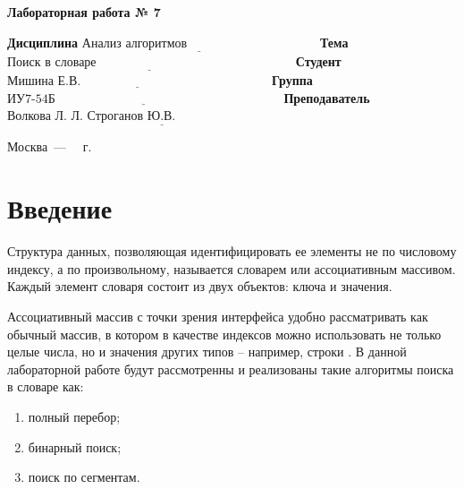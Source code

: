 \documentclass[12pt]{report}
\begin{document}
\begin{center}
\Large\textbf{Лабораторная работа № 7}
\end{center}
\vspace{\baselineskip}
\noindent\textbf{Дисциплина} $\underline{\text{Анализ алгоритмов~~~~~~~~~~~~~~~~~~~~~~~~~~~~~~~}}$\newline\newline
\noindent\textbf{Тема} $\underline{\text{Поиск в словаре~~~~~~~~~~~~~~~~~~~~~~~~~~~~~~~~~~~~~~~~~~~~~~~}}$\newline\newline
\noindent\textbf{Студент} $\underline{\text{Мишина Е.В.~~~~~~~~~~~~~~~~~~~~~~~~~~~~~~~~~~~~~~~~~~~~~}}$\newline\newline
\noindent\textbf{Группа} $\underline{\text{ИУ7-54Б~~~~~~~~~~~~~~~~~~~~~~~~~~~~~~~~~~~~~~~~~~~~~~~~~~~~~~}}$\newline\newline
\noindent\textbf{Преподаватель} $\underline{\text{Волкова Л. Л. Строганов Ю.В.~~~~~~~~~~~~~~~~~~~~~~~~~~~~~~~~~~}}$\newline

\begin{center}
	\vfill
	Москва~---~\the\year
	~г.
\end{center}
\clearpage

\tableofcontents

\newpage
\chapter*{Введение}
Структура данных, позволяющая идентифицировать ее элементы не
по числовому индексу, а по произвольному, называется словарем или ассоциативным массивом. Каждый элемент словаря состоит из двух объектов:
ключа и значения. 

Ассоциативный массив с точки зрения интерфейса удобно рассматривать как обычный массив, в котором в качестве индексов можно использовать не только целые числа, но и значения других типов – например, строки \cite{dict}.
В данной лабораторной работе будут рассмотренны и реализованы такие алгоритмы поиска в словаре как:
\begin{enumerate}
	\item полный перебор;
	\item бинарный поиск;
	\item поиск по сегментам.
\end{enumerate}
\vspace{\baselineskip}
\end{document}
